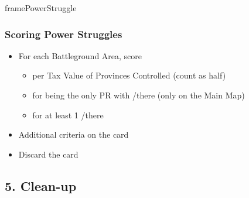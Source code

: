 \documentclass[10pt]{article}
\begin{document}
\begin{dynamiccontents*}{framePowerStruggle}
	\subsubsection*{Scoring Power Struggles }
	\begin{itemize}
		\item For each Battleground Area, score
		\begin{itemize}
			\item {} per Tax Value of Provinces Controlled (\vassals count as half)
			\item {} for being the only PR with \towns/\vassals there (only on the Main Map)
			\item {} for at least 1 \alliance/\marriage there
		\end{itemize}
		\item Additional criteria on the card
		\item Discard the card
	\end{itemize}
\end{dynamiccontents*}

\subsection*{5. Clean-up}
\end{document}
